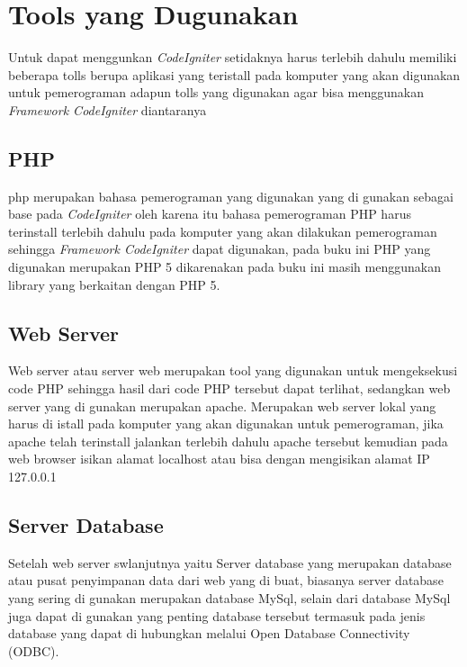 \section{ Tools yang Dugunakan}
Untuk dapat menggunkan \textit{CodeIgniter} setidaknya harus terlebih dahulu memiliki beberapa tolls berupa aplikasi yang teristall pada komputer yang akan digunakan untuk pemerograman adapun tolls yang digunakan agar bisa menggunakan \textit{Framework CodeIgniter} diantaranya\par

\subsection{PHP}
	php merupakan bahasa pemerograman yang digunakan yang di gunakan sebagai base pada \textit{CodeIgniter} oleh karena itu bahasa pemerograman PHP harus terinstall terlebih dahulu pada komputer yang akan dilakukan pemerograman sehingga \textit{Framework CodeIgniter} dapat digunakan, pada buku ini PHP yang digunakan merupakan PHP 5 dikarenakan pada buku ini masih menggunakan library yang berkaitan dengan PHP 5.\par

\subsection{Web Server}
Web server atau server web merupakan tool yang digunakan untuk mengeksekusi code PHP sehingga hasil dari code PHP tersebut dapat terlihat, sedangkan web server yang di gunakan merupakan apache. Merupakan web server lokal yang harus di istall pada komputer yang akan digunakan untuk pemerograman, jika apache telah terinstall jalankan terlebih dahulu apache tersebut kemudian pada web browser isikan alamat localhost atau bisa dengan mengisikan alamat IP 127.0.0.1\par

\subsection{Server Database }
Setelah web server swlanjutnya yaitu Server database yang merupakan database atau pusat penyimpanan data dari web yang di buat, biasanya server database yang sering di gunakan merupakan database MySql, selain dari database MySql juga dapat di gunakan yang penting database tersebut termasuk pada jenis database yang dapat di hubungkan melalui Open Database Connectivity (ODBC).\par

